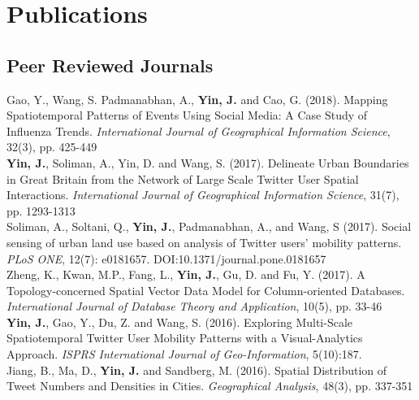 \documentclass[11pt, a4paper]{article}
\newcommand{\years}[1]{\marginnote{\scriptsize #1}}
\begin{document}
\section*{Publications}

\subsection*{Peer Reviewed Journals}
\noindent
\years{2018}Gao, Y., Wang, S. Padmanabhan, A., \textbf{Yin, J.} and Cao, G. (2018). Mapping Spatiotemporal Patterns of Events Using Social Media: A Case Study of Influenza Trends. \textit{International Journal of Geographical Information Science}, 32(3), pp. 425-449\\
\years{2017}\textbf{Yin, J.}, Soliman, A., Yin, D. and Wang, S. (2017). Delineate Urban Boundaries in Great Britain from the Network of Large Scale Twitter User Spatial Interactions. \textit{International Journal of Geographical Information Science}, 31(7), pp. 1293-1313\\
\years{2017} Soliman, A., Soltani, Q., \textbf{Yin, J.}, Padmanabhan, A., and Wang, S (2017). Social sensing of urban land use based on analysis of Twitter users' mobility patterns. \textit{PLoS ONE}, 12(7): e0181657. DOI:10.1371/journal.pone.0181657\\
\years{2017}Zheng, K., Kwan, M.P., Fang, L., \textbf{Yin, J.}, Gu, D. and Fu, Y. (2017). A Topology-concerned Spatial Vector Data Model for Column-oriented Databases. \textit{International Journal of Database Theory and Application}, 10(5), pp. 33-46\\
\years{2016}\textbf{Yin, J.}, Gao, Y., Du, Z. and Wang, S. (2016). Exploring Multi-Scale Spatiotemporal Twitter User Mobility Patterns with a Visual-Analytics Approach. \textit{ISPRS International Journal of Geo-Information}, 5(10):187.\\
\years{2016}Jiang, B., Ma, D., \textbf{Yin, J.} and Sandberg, M. (2016). Spatial Distribution of Tweet Numbers and Densities in Cities. \textit{Geographical Analysis}, 48(3), pp. 337-351\\
\end{document}
